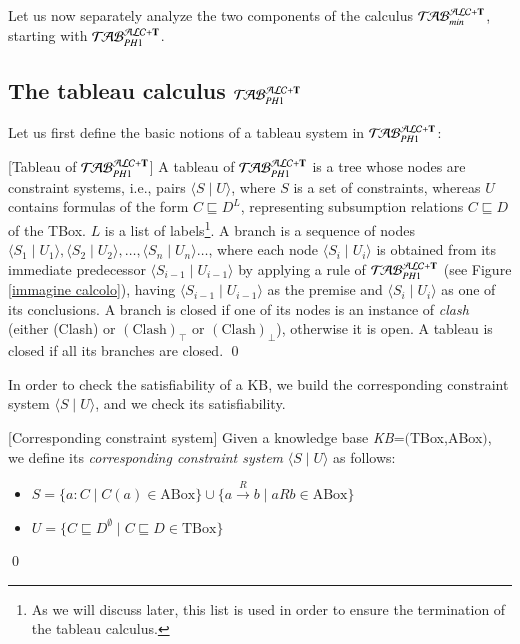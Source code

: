 \documentclass[a4paper, 11pt, oneside]{elsarticle}
\newcommand{\tip}{{\bf T}}
\newcommand{\unione} {\cup}
\newcommand{\vuoto} {\emptyset}
\newcommand{\tc} {\mid}
\newcommand{\sx} {\langle}
\newcommand{\dx} {\rangle}
\newcommand{\nuovoc}{\mathrel{{\mathcal{T}\!\mathcal{AB}}}_{min}^{\mathcal{ALC}+\mbox{\scriptsize $\tip$}}}
\newcommand{\primo}{\mathrel{{\mathcal{T}\!\mathcal{AB}}}_{PH 1}^{\mathcal{ALC}+\mbox{\scriptsize $\tip$}}}
\newcommand{\trans}[1]{\stackrel{#1}{\longrightarrow}}
\newenvironment{definition}
{\begin{defi} \rm}{\qed \end{defi}}
\newcounter{posu}
\newtheorem{definition}[posu]{Definition}
\begin{document}
Let us now separately analyze the two components of the calculus $\nuovoc$, starting with $\primo$.


\subsection{The tableau calculus $\primo$}

Let us first define the basic notions of a tableau system in
$\primo$:


\begin{definition}[Tableau of $\primo$]\label{deftableau}
A tableau of $\primo$ is a tree whose nodes are constraint
systems, i.e., pairs $\sx S \tc U \dx$, where $S$ is a set of
constraints, whereas $U$ contains formulas of the form $C
\sqsubseteq D^L$, representing subsumption relations $C
\sqsubseteq D$ of the TBox. $L$ is a list of labels\footnote{As we
will discuss later, this list is used in order to ensure the
termination of the tableau calculus.}. A branch is a sequence of
nodes $\sx S_1 \tc U_1 \dx, \sx S_2 \tc U_2 \dx, \dots, \sx S_n
 \tc U_n \dx \dots$, where each node
$\sx S_i \tc U_i \dx$ is obtained from its immediate predecessor
$\sx S_{i-1} \tc U_{i-1} \dx$ by applying a rule of $\primo$ (see
Figure \ref{immagine calcolo}), having $\sx S_{i-1} \tc U_{i-1}
\dx$ as the premise and $\sx S_{i} \tc U_{i} \dx$ as one of its
conclusions. A branch is closed if one of its nodes is an instance \color{black}
of \emph{clash} (either (Clash) or $(\mbox{Clash})_\top$ or $(\mbox{Clash})_\bot$), \normalcolor otherwise it is open. A tableau is closed if all its
branches are closed.
\end{definition}

\noindent In order to check the satisfiability of a KB, we build the
corresponding constraint system $\sx S \tc U \dx$, and we check
its satisfiability.

\begin{definition}[Corresponding constraint system]\label{corresponding constraint system}
Given a knowledge base \emph{KB}=$($TBox,ABox$)$, we define its \emph{corresponding constraint system} $\sx S \tc U \dx$ as follows:

\begin{itemize}
 \item $S=\{a: C \tc C(a) \in \mbox{ABox}\} \unione \{a \trans{R} b \tc a R b \in \mbox{ABox}\}$
 \item $U=\{C \sqsubseteq D^{\vuoto} \tc C \sqsubseteq D \in \mbox{TBox}\}$
\end{itemize}

\end{definition}
\end{document}

